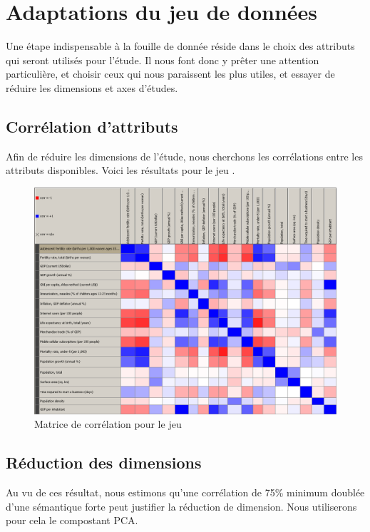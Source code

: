 \section{Adaptations du jeu de données}

Une étape indispensable à la fouille de donnée réside dans le choix des attributs qui seront utilisés pour l'étude.
Il nous font donc y prêter une attention particulière, et choisir ceux qui nous paraissent les plus utiles, et essayer de réduire les dimensions et axes d'études.

\subsection{Corrélation d'attributs}

Afin de réduire les dimensions de l'étude, nous cherchons les corrélations entre les attributs disponibles. Voici les résultats pour le jeu \jeuc.

\begin{figure}[H]
	\begin{center}
		\includegraphics[scale=0.5]{Image/MatriceCorrelationNoMissing2}
		\caption{Matrice de corrélation pour le jeu \jeuc}
	\end{center}
\end{figure}

\subsection{Réduction des dimensions}

Au vu de ces résultat, nous estimons qu'une corrélation de 75\% minimum doublée d'une sémantique forte peut justifier la réduction de dimension. Nous utiliserons pour cela le compostant PCA.
 
